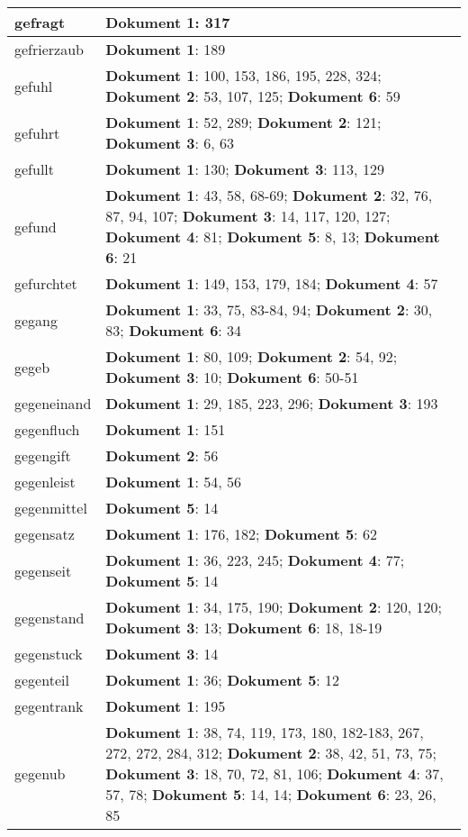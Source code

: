 \documentclass[a5paper]{article}
\begin{document}
\begin{longtable}[l]{|l|p{3in}|}
\hline
gefragt & \textbf{Dokument 1}: 317 \\
\hline
gefrierzaub & \textbf{Dokument 1}: 189 \\
\hline
gefuhl & \textbf{Dokument 1}: 100, 153, 186, 195, 228, 324; \textbf{Dokument 2}: 53, 107, 125; \textbf{Dokument 6}: 59 \\
\hline
gefuhrt & \textbf{Dokument 1}: 52, 289; \textbf{Dokument 2}: 121; \textbf{Dokument 3}: 6, 63 \\
\hline
gefullt & \textbf{Dokument 1}: 130; \textbf{Dokument 3}: 113, 129 \\
\hline
gefund & \textbf{Dokument 1}: 43, 58, 68-69; \textbf{Dokument 2}: 32, 76, 87, 94, 107; \textbf{Dokument 3}: 14, 117, 120, 127; \textbf{Dokument 4}: 81; \textbf{Dokument 5}: 8, 13; \textbf{Dokument 6}: 21 \\
\hline
gefurchtet & \textbf{Dokument 1}: 149, 153, 179, 184; \textbf{Dokument 4}: 57 \\
\hline
gegang & \textbf{Dokument 1}: 33, 75, 83-84, 94; \textbf{Dokument 2}: 30, 83; \textbf{Dokument 6}: 34 \\
\hline
gegeb & \textbf{Dokument 1}: 80, 109; \textbf{Dokument 2}: 54, 92; \textbf{Dokument 3}: 10; \textbf{Dokument 6}: 50-51 \\
\hline
gegeneinand & \textbf{Dokument 1}: 29, 185, 223, 296; \textbf{Dokument 3}: 193 \\
\hline
gegenfluch & \textbf{Dokument 1}: 151 \\
\hline
gegengift & \textbf{Dokument 2}: 56 \\
\hline
gegenleist & \textbf{Dokument 1}: 54, 56 \\
\hline
gegenmittel & \textbf{Dokument 5}: 14 \\
\hline
gegensatz & \textbf{Dokument 1}: 176, 182; \textbf{Dokument 5}: 62 \\
\hline
gegenseit & \textbf{Dokument 1}: 36, 223, 245; \textbf{Dokument 4}: 77; \textbf{Dokument 5}: 14 \\
\hline
gegenstand & \textbf{Dokument 1}: 34, 175, 190; \textbf{Dokument 2}: 120, 120; \textbf{Dokument 3}: 13; \textbf{Dokument 6}: 18, 18-19 \\
\hline
gegenstuck & \textbf{Dokument 3}: 14 \\
\hline
gegenteil & \textbf{Dokument 1}: 36; \textbf{Dokument 5}: 12 \\
\hline
gegentrank & \textbf{Dokument 1}: 195 \\
\hline
gegenub & \textbf{Dokument 1}: 38, 74, 119, 173, 180, 182-183, 267, 272, 272, 284, 312; \textbf{Dokument 2}: 38, 42, 51, 73, 75; \textbf{Dokument 3}: 18, 70, 72, 81, 106; \textbf{Dokument 4}: 37, 57, 78; \textbf{Dokument 5}: 14, 14; \textbf{Dokument 6}: 23, 26, 85 \\

\end{longtable}
\end{document}
